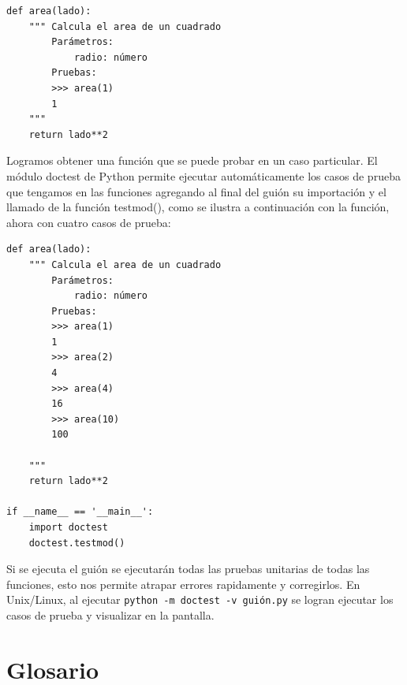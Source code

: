\beforeverb
\begin{verbatim}
def area(lado):
    """ Calcula el area de un cuadrado
        Parámetros:
            radio: número
        Pruebas:
        >>> area(1)
        1        
    """
    return lado**2
\end{verbatim}
\afterverb

Logramos obtener una función que se puede probar en un caso particular. El 
módulo doctest de Python permite ejecutar automáticamente los casos de 
prueba que tengamos en las funciones agregando al final del guión
su importación y el llamado de la función testmod(), como se ilustra a
continuación con la función, ahora con cuatro casos de prueba:

\beforeverb
\begin{verbatim}
def area(lado):
    """ Calcula el area de un cuadrado
        Parámetros:
            radio: número
        Pruebas:
        >>> area(1)
        1
        >>> area(2)
        4
        >>> area(4)
        16
        >>> area(10)
        100
        
    """
    return lado**2

if __name__ == '__main__':
    import doctest
    doctest.testmod()
\end{verbatim}
\afterverb

Si se ejecuta el guión se ejecutarán todas las pruebas unitarias de todas
las funciones, esto nos permite atrapar errores rapidamente y corregirlos. 
En Unix/Linux, al ejecutar \verb+python -m doctest -v guión.py+ se logran 
ejecutar los casos de prueba y visualizar en la pantalla.

\section{Glosario}

